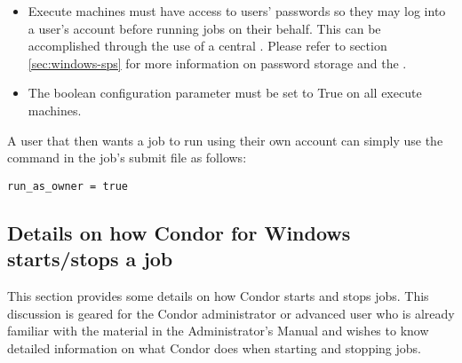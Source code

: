 \begin{itemize}
\item Execute machines must have access to users' passwords so they
      may log into a user's account before running jobs on their
      behalf.  This can be accomplished through the use of a central
      . Please refer to section \ref{sec:windows-sps}
      for more information on password storage and the .
\item The boolean configuration parameter
       must be set to True on all
      execute machines.
\end{itemize}

A user that then wants a job to run using their own account can simply
use the  command in the job's submit file as
follows:
\begin{verbatim}
run_as_owner = true
\end{verbatim}

\subsection{Details on how Condor for Windows starts/stops a job}

This section provides some details on how Condor starts and stops jobs.
This discussion is geared for the Condor administrator or advanced user who is
already familiar with the material in the Administrator's Manual
and wishes to know detailed information on what Condor does when
starting and stopping jobs.

